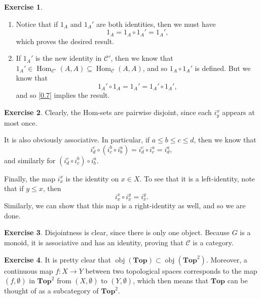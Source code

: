 \documentclass{article}
\theoremstyle{definition}
\newtheorem{intex}{Exercise}[section]
\newenvironment{exercise}{\begin{intex}\label{\theintex}}{\end{intex}}
\DeclareMathOperator\obj{obj}
\DeclareMathOperator\Hom{Hom}
\newcommand*\Cat[1]{\textbf{#1}}
\newcommand*\Top{\Cat{Top}}
\begin{document}
\begin{exercise} \leavevmode 
\begin{enumerate} 
\item Notice that if $1_A$ and $1_A'$ are both identities, then we must have \[1_A=1_A\circ 1_A'=1_A',\] which proves the desired result. 

\item If $1_A'$ is the new identity in $\mathcal C'$, then we know that $1_A'\in\Hom_{\mathcal C'}(A,A)\subseteq\Hom_{\mathcal C}(A,A)$, and so $1_A\circ 1_A'$ is defined. But we know that \[1_A'\circ1_A=1_A'=1_A'\circ1_A',\] and so \cref{0.7} implies the result. 
\end{enumerate} 
\end{exercise} 

\begin{exercise}
Clearly, the Hom-sets are pairwise disjoint, since each $i^x_y$ appears at most once. 

It is also obviously associative. In particular, if $a\le b\le c\le d$, then we know that \[i^c_d\circ\left(i^b_c\circ i^a_b\right)=i^c_d\circ i^a_c=i^a_d,\] and similarly for $\left(i^c_d\circ i^b_c\right)\circ i^a_b$. 

Finally, the map $i^x_x$ is the identity on $x\in X$. To see that it is a left-identity, note that if $y\le x$, then \[i_x^x\circ i_x^y=i_x^y.\] Similarly, we can show that this map is a right-identity as well, and so we are done. 
\end{exercise} 

\begin{exercise}
Disjointness is clear, since there is only one object. Because $G$ is a monoid, it is associative and has an identity, proving that $\mathcal C$ is a category. 
\end{exercise} 

\begin{exercise}
It is pretty clear that $\obj(\Top)\subset\obj(\Top^2)$. Moreover, a continuous map $f:X\to Y$ between two topological spaces corresponds to the map $(f,\emptyset)$ in $\Top^2$ from $(X,\emptyset)$ to $(Y,\emptyset)$, which then means that $\Top$ can be thought of as a subcategory of $\Top^2$. 
\end{exercise} 
\end{document}

